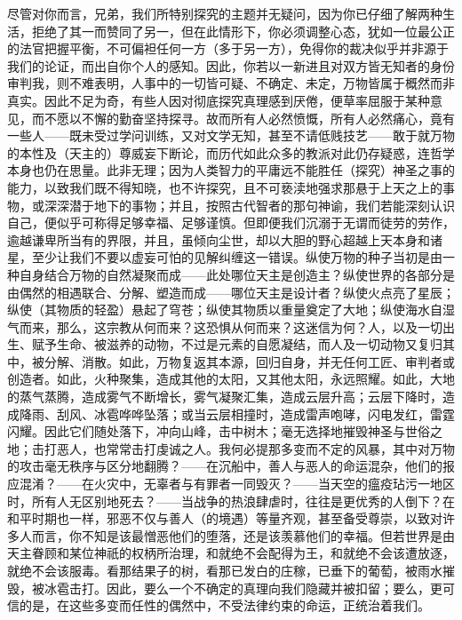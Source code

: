 尽管对你而言，兄弟，我们所特别探究的主题并无疑问，因为你已仔细了解两种生活，拒绝了其一而赞同了另一，但在此情形下，你必须调整心态，犹如一位最公正的法官把握平衡，不可偏袒任何一方（多于另一方），免得你的裁决似乎并非源于我们的论证，而出自你个人的感知。因此，你若以一新进且对双方皆无知者的身份审判我，则不难表明，人事中的一切皆可疑、不确定、未定，万物皆属于概然而非真实。因此不足为奇，有些人因对彻底探究真理感到厌倦，便草率屈服于某种意见，而不愿以不懈的勤奋坚持探寻。故而所有人必然愤慨，所有人必然痛心，竟有一些人——既未受过学问训练，又对文学无知，甚至不请低贱技艺——敢于就万物的本性及（天主的）尊威妄下断论，而历代如此众多的教派对此仍存疑惑，连哲学本身也仍在思量。此非无理；因为人类智力的平庸远不能胜任（探究）神圣之事的能力，以致我们既不得知晓，也不许探究，且不可亵渎地强求那悬于上天之上的事物，或深深潜于地下的事物；并且，按照古代智者的那句神谕，我们若能深刻认识自己，便似乎可称得足够幸福、足够谨慎。但即便我们沉溺于无谓而徒劳的劳作，逾越谦卑所当有的界限，并且，虽倾向尘世，却以大胆的野心超越上天本身和诸星，至少让我们不要以虚妄可怕的见解纠缠这一错误。纵使万物的种子当初是由一种自身结合万物的自然凝聚而成——此处哪位天主是创造主？纵使世界的各部分是由偶然的相遇联合、分解、塑造而成——哪位天主是设计者？纵使火点亮了星辰；纵使（其物质的轻盈）悬起了穹苍；纵使其物质以重量奠定了大地；纵使海水自湿气而来，那么，这宗教从何而来？这恐惧从何而来？这迷信为何？人，以及一切出生、赋予生命、被滋养的动物，不过是元素的自愿凝结，而人及一切动物又复归其中，被分解、消散。如此，万物复返其本源，回归自身，并无任何工匠、审判者或创造者。如此，火种聚集，造成其他的太阳，又其他太阳，永远照耀。如此，大地的蒸气蒸腾，造成雾气不断增长，雾气凝聚汇集，造成云层升高；云层下降时，造成降雨、刮风、冰雹哗哗坠落；或当云层相撞时，造成雷声咆哮，闪电发红，雷霆闪耀。因此它们随处落下，冲向山峰，击中树木；毫无选择地摧毁神圣与世俗之地；击打恶人，也常常击打虔诚之人。我何必提那多变而不定的风暴，其中对万物的攻击毫无秩序与区分地翻腾？——在沉船中，善人与恶人的命运混杂，他们的报应混淆？——在火灾中，无辜者与有罪者一同毁灭？——当天空的瘟疫玷污一地区时，所有人无区别地死去？——当战争的热浪肆虐时，往往是更优秀的人倒下？在和平时期也一样，邪恶不仅与善人（的境遇）等量齐观，甚至备受尊崇，以致对许多人而言，你不知是该最憎恶他们的堕落，还是该羡慕他们的幸福。但若世界是由天主眷顾和某位神祇的权柄所治理，和就绝不会配得为王，和就绝不会该遭放逐，就绝不会该服毒。看那结果子的树，看那已发白的庄稼，已垂下的葡萄，被雨水摧毁，被冰雹击打。因此，要么一个不确定的真理向我们隐藏并被扣留；要么，更可信的是，在这些多变而任性的偶然中，不受法律约束的命运，正统治着我们。\par

